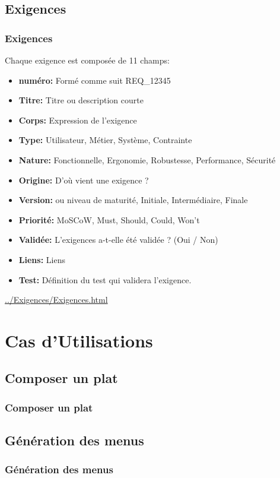 \documentclass{beamer}
\begin{document}
\subsection{Exigences}
\begin{frame}
 \frametitle{Exigences}
Chaque exigence est composée de 11 champs:
\begin{itemize}
\item \textbf{numéro:} Formé comme suit REQ\_12345
\item \textbf{Titre:} Titre ou description courte
\item \textbf{Corps:} Expression de l'exigence
\item \textbf{Type:} Utilisateur, Métier, Système, Contrainte
\item \textbf{Nature:} Fonctionnelle, Ergonomie, Robustesse, Performance, Sécurité
\item \textbf{Origine:} D'où vient une exigence ?
\item \textbf{Version:} ou niveau de maturité, Initiale, Intermédiaire, Finale
\item \textbf{Priorité:} MoSCoW, Must, Should, Could, Won't
\item \textbf{Validée:} L'exigences a-t-elle été validée ? (Oui / Non)
\item \textbf{Liens:} Liens
\item \textbf{Test:} Définition du test qui validera l'exigence.
\end{itemize}

\url{../Exigences/Exigences.html}
\end{frame}

\section{Cas d'Utilisations}
\subsection{Composer un plat}
\begin{frame}
\frametitle{Composer un plat}

\end{frame}

\subsection{Génération des menus}
\begin{frame}
\frametitle{Génération des menus}

\end{frame}
\end{document}
